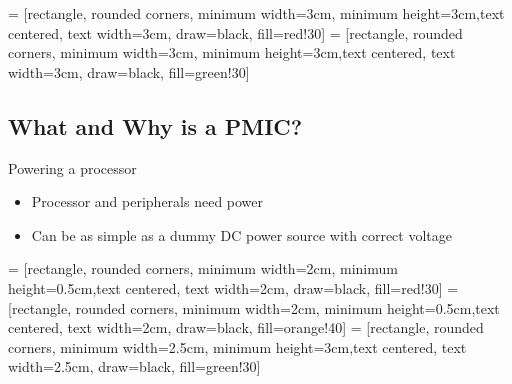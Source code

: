\documentclass[10pt]{beamer}
\begin{document}
 = [rectangle, rounded corners, minimum width=3cm, minimum height=3cm,text centered, text width=3cm, draw=black, fill=red!30]
 = [rectangle, rounded corners, minimum width=3cm, minimum height=3cm,text centered, text width=3cm, draw=black, fill=green!30]

\begin{frame}
\section{What and Why is a PMIC?}
\end{frame}

\begin{frame}[t]{Powering a processor}\vspace{4pt}
\begin{itemize}
	\item Processor and peripherals need power
	\item Can be as simple as a dummy DC power source with correct voltage
\end{itemize}


\vfill
\centering
\begin{minipage}[c]{.75\textwidth}

\end{minipage}
\end{frame}


 = [rectangle, rounded corners, minimum width=2cm, minimum height=0.5cm,text centered, text width=2cm, draw=black, fill=red!30]
 = [rectangle, rounded corners, minimum width=2cm, minimum height=0.5cm,text centered, text width=2cm, draw=black, fill=orange!40]
 = [rectangle, rounded corners, minimum width=2.5cm, minimum height=3cm,text centered, text width=2.5cm, draw=black, fill=green!30]
\end{document}
